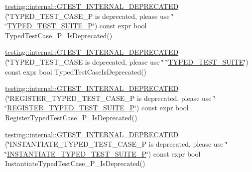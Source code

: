 \begin{DoxyCompactItemize}
$$\item 
\mbox{\hyperlink{namespacetesting_1_1internal_ac2bac410cd8b9ecbc8f4ccc921e61cee}{testing\+::internal\+::\+G\+T\+E\+S\+T\+\_\+\+I\+N\+T\+E\+R\+N\+A\+L\+\_\+\+D\+E\+P\+R\+E\+C\+A\+T\+ED}} (\char`\"{}T\+Y\+P\+E\+D\+\_\+\+T\+E\+S\+T\+\_\+\+C\+A\+S\+E\+\_\+P is deprecated, please use \char`\"{} \char`\"{}\mbox{\hyperlink{_obj__test_2lib_2googletest-master_2googletest_2test_2googletest-list-tests-unittest___8cc_a8ee0021cbd9bdfcb7c02ce2607805dfc}{T\+Y\+P\+E\+D\+\_\+\+T\+E\+S\+T\+\_\+\+S\+U\+I\+T\+E\+\_\+P}}\char`\"{}) const expr bool Typed\+Test\+Case\+\_\+\+P\+\_\+\+Is\+Deprecated()
\item 
\mbox{\hyperlink{namespacetesting_1_1internal_ac7c25a00ce37b8f6c7ea16814233b281}{testing\+::internal\+::\+G\+T\+E\+S\+T\+\_\+\+I\+N\+T\+E\+R\+N\+A\+L\+\_\+\+D\+E\+P\+R\+E\+C\+A\+T\+ED}} (\char`\"{}T\+Y\+P\+E\+D\+\_\+\+T\+E\+S\+T\+\_\+\+C\+A\+SE is deprecated, please use \char`\"{} \char`\"{}\mbox{\hyperlink{_obj__test_2lib_2googletest-master_2googletest_2test_2googletest-list-tests-unittest___8cc_a346de8e681bc95011fed254a54e30205}{T\+Y\+P\+E\+D\+\_\+\+T\+E\+S\+T\+\_\+\+S\+U\+I\+TE}}\char`\"{}) const expr bool Typed\+Test\+Case\+Is\+Deprecated()
\item 
\mbox{\hyperlink{namespacetesting_1_1internal_ad10c37bd148fb8988a1d99e127891203}{testing\+::internal\+::\+G\+T\+E\+S\+T\+\_\+\+I\+N\+T\+E\+R\+N\+A\+L\+\_\+\+D\+E\+P\+R\+E\+C\+A\+T\+ED}} (\char`\"{}R\+E\+G\+I\+S\+T\+E\+R\+\_\+\+T\+Y\+P\+E\+D\+\_\+\+T\+E\+S\+T\+\_\+\+C\+A\+S\+E\+\_\+P is deprecated, please use \char`\"{} \char`\"{}\mbox{\hyperlink{_obj__test_2lib_2googletest-master_2googletest_2test_2googletest-list-tests-unittest___8cc_a24c35f734ffc5235cc3881d22717d506}{R\+E\+G\+I\+S\+T\+E\+R\+\_\+\+T\+Y\+P\+E\+D\+\_\+\+T\+E\+S\+T\+\_\+\+S\+U\+I\+T\+E\+\_\+P}}\char`\"{}) const expr bool Register\+Typed\+Test\+Case\+\_\+\+P\+\_\+\+Is\+Deprecated()
\item 
\mbox{\hyperlink{namespacetesting_1_1internal_ab9dabaaecfb36c469b3382a169a581db}{testing\+::internal\+::\+G\+T\+E\+S\+T\+\_\+\+I\+N\+T\+E\+R\+N\+A\+L\+\_\+\+D\+E\+P\+R\+E\+C\+A\+T\+ED}} (\char`\"{}I\+N\+S\+T\+A\+N\+T\+I\+A\+T\+E\+\_\+\+T\+Y\+P\+E\+D\+\_\+\+T\+E\+S\+T\+\_\+\+C\+A\+S\+E\+\_\+P is deprecated, please use \char`\"{} \char`\"{}\mbox{\hyperlink{_obj__test_2lib_2googletest-master_2googletest_2test_2googletest-list-tests-unittest___8cc_afbb047642153cc08001200d1c24f278a}{I\+N\+S\+T\+A\+N\+T\+I\+A\+T\+E\+\_\+\+T\+Y\+P\+E\+D\+\_\+\+T\+E\+S\+T\+\_\+\+S\+U\+I\+T\+E\+\_\+P}}\char`\"{}) const expr bool Instantiate\+Typed\+Test\+Case\+\_\+\+P\+\_\+\+Is\+Deprecated()
\end{DoxyCompactItemize}



